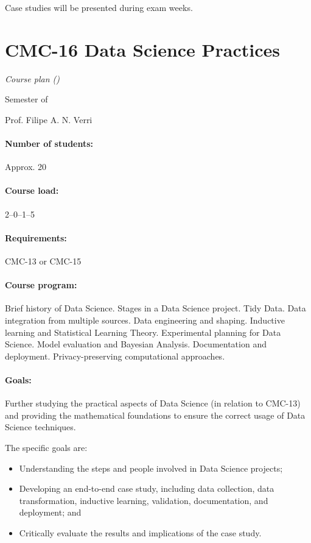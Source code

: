 Case studies will be presented during exam weeks.

\newpage
{}
\thispagestyle{empty}
\section*{CMC-16 Data Science Practices}

\emph{Course plan (\the\year{})}

 Semester of \the\year{}

Prof. Filipe A. N. Verri

\paragraph{Number of students:} Approx. 20

\paragraph{Course load:} 2--0--1--5

\paragraph{Requirements:} CMC-13 or CMC-15

\paragraph{Course program:}
Brief history of Data Science. Stages in a Data Science project. Tidy Data. Data
integration from multiple sources. Data engineering and shaping. Inductive learning and
Statistical Learning Theory. Experimental planning for Data Science. Model evaluation and
Bayesian Analysis. Documentation and deployment. Privacy-preserving computational
approaches.

\paragraph{Goals:}
Further studying the practical aspects of Data Science (in relation to CMC-13) and providing
the mathematical foundations to ensure the correct usage of Data Science techniques.

The specific goals are:
\begin{itemize}
  \item Understanding the steps and people involved in Data Science projects;
  \item Developing an end-to-end case study, including data collection, data transformation,
    inductive learning, validation, documentation, and deployment; and
  \item Critically evaluate the results and implications of the case study.
\end{itemize}

